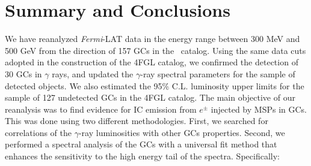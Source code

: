 \documentclass[doublespace,draft,nopageskip]{VTthesis} %
\begin{document}
\section{Summary and Conclusions}\label{sec:conclusion}

We have reanalyzed \textit{Fermi}-LAT data in the energy range between 300 MeV and 500 GeV from the direction of 157 GCs in the~\citet{1996AJ....112.1487H} catalog. Using the same data cuts adopted in the construction of the 4FGL catalog, we confirmed the detection of 30 GCs in $\gamma$ rays, and updated the $\gamma$-ray spectral parameters for the sample of detected objects. We also estimated the 95\% C.L. luminosity upper limits for the sample of 127 undetected GCs in the 4FGL catalog. The main objective of our reanalysis was to find evidence for IC emission from $e^{\pm}$ injected by MSPs in GCs. This was done using two different methodologies. First, we searched for correlations of the $\gamma$-ray luminosities with other GCs properties. Second, we performed a spectral analysis of the GCs with a universal fit method that enhances the sensitivity to the high energy tail of the spectra. Specifically:
\end{document}
